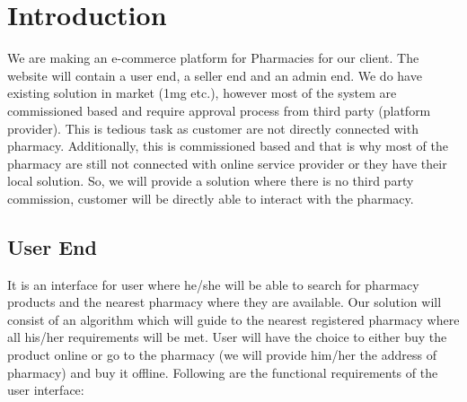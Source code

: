 \documentclass[fleqn,10pt]{../SelfArx} %
\affiliation{\textit{D-Enigma (Group - CS 01)}} %
\affiliation{\textit{Indian Institute of Information Technology, Vadodara.}} %
\begin{document}
\sffamily
\flushbottom %

\maketitle %

\tableofcontents %

\thispagestyle{empty} %


\section{Introduction} %

We are making an e-commerce platform for Pharmacies for our client. The website will contain a user end, a seller end and an admin end. We do have existing solution in market (1mg etc.), however most of the system are commissioned based and require approval process from third party (platform provider). This is tedious task as customer are not directly connected with pharmacy. Additionally, this is commissioned based and that is why most of the pharmacy are still not connected with online service provider or they have their local solution. So, we will provide a solution where there is no third party commission, customer will be directly able to interact with the pharmacy.


\subsection{User End}

It is an interface for user where he/she will be able to search for pharmacy products and the nearest pharmacy where they are available. Our solution will consist of an algorithm which will guide to the nearest registered pharmacy where all his/her requirements will be met. User will have the choice to either buy the product online or go to the pharmacy (we will provide him/her the address of pharmacy) and buy it offline. Following are the functional requirements of the user interface:
\end{document}
